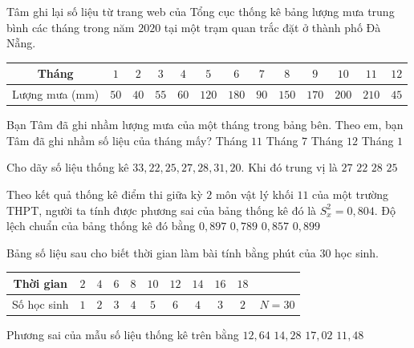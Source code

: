\begin{ex}%
Tâm ghi lại số liệu từ trang web của Tổng cục thống kê bảng lượng mưa trung bình các tháng trong năm $2020$ tại một trạm quan trắc đặt ở thành phố Đà Nẵng.
\begin{longtable}{|c|c|c|c|c|c|c|c|c|c|c|c|c|}
	\hline
	Tháng&$1$&$2$&$3$&$4$&$5$&$6$&$7$&$8$&$9$&$10$&$11$&$12$\\
	\hline
	Lượng mưa (mm)&$50$&$40$&$55$&$60$&$120$&$180$&$90$&$150$&$170$&$200$&$210$&$45$\\
	\hline
\end{longtable}
Bạn Tâm đã ghi nhầm lượng mưa của một tháng trong bảng bên. Theo em, bạn Tâm đã ghi nhầm số liệu của tháng mấy?
\choice
{Tháng $11$}
{\True Tháng $7$}
{Tháng $12$}
{Tháng $1$}
\end{ex}
\begin{ex}%
Cho dãy số liệu thống kê $33, 22, 25, 27, 28, 31, 20$. Khi đó trung vị là
\choice
{\True $27$}
{$22$}
{$28$}
{$25$}
\end{ex}
\begin{ex}%
Theo kết quả thống kê điểm thi giữa kỳ $2$ môn vật lý khối $11$ của một trường THPT, người ta tính được phương sai của bảng thống kê đó là $S_x^2 = 0{,}804$. Độ lệch chuẩn của bảng thống kê đó bằng
\choice
{\True $0{,}897$}
{$0{,}789$}
{$0{,}857$}
{$0{,}899$}
\end{ex}
\begin{ex}%
Bảng số liệu sau cho biết thời gian làm bài tính bằng phút của $30$ học sinh.
\begin{longtable}{|c|c|c|c|c|c|c|c|c|c|c|}
	\hline
	Thời gian&$2$&$4$&$6$&$8$&$10$&$12$&$14$&$16$&$18$&\\
	\hline
	Số học sinh&$1$&$2$&$3$&$4$&$5$&$6$&$4$&$3$&$2$&$N=30$\\
	\hline
\end{longtable}
Phương sai của mẫu số liệu thống kê trên bằng
\choice
{$12{,}64$}
{$14{,}28$}
{\True $17{,}02$}
{$11{,}48$}
\end{ex}

